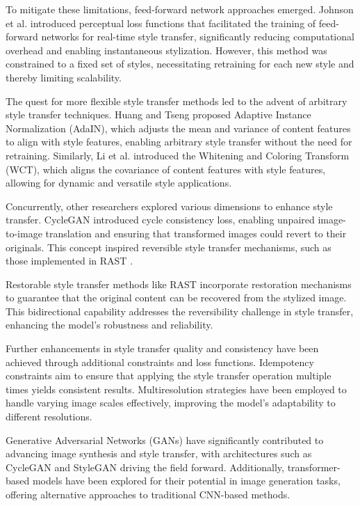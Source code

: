 \documentclass{article}
\begin{document}
To mitigate these limitations, feed-forward network approaches emerged. Johnson et al. \cite{Johnson2016} introduced perceptual loss functions that facilitated the training of feed-forward networks for real-time style transfer, significantly reducing computational overhead and enabling instantaneous stylization. However, this method was constrained to a fixed set of styles, necessitating retraining for each new style and thereby limiting scalability.

The quest for more flexible style transfer methods led to the advent of arbitrary style transfer techniques. Huang and Tseng \cite{Huang2017} proposed Adaptive Instance Normalization (AdaIN), which adjusts the mean and variance of content features to align with style features, enabling arbitrary style transfer without the need for retraining. Similarly, Li et al. \cite{Li2017} introduced the Whitening and Coloring Transform (WCT), which aligns the covariance of content features with style features, allowing for dynamic and versatile style applications.

Concurrently, other researchers explored various dimensions to enhance style transfer. CycleGAN \cite{CycleGAN2017} introduced cycle consistency loss, enabling unpaired image-to-image translation and ensuring that transformed images could revert to their originals. This concept inspired reversible style transfer mechanisms, such as those implemented in RAST \cite{Ma2023RAST}.

Restorable style transfer methods like RAST incorporate restoration mechanisms to guarantee that the original content can be recovered from the stylized image. This bidirectional capability addresses the reversibility challenge in style transfer, enhancing the model's robustness and reliability.

Further enhancements in style transfer quality and consistency have been achieved through additional constraints and loss functions. Idempotency constraints aim to ensure that applying the style transfer operation multiple times yields consistent results. Multiresolution strategies \cite{Li2018, Fernandez2019} have been employed to handle varying image scales effectively, improving the model's adaptability to different resolutions.

Generative Adversarial Networks (GANs) \cite{Goodfellow2014} have significantly contributed to advancing image synthesis and style transfer, with architectures such as CycleGAN \cite{CycleGAN2017} and StyleGAN \cite{StyleGAN2019} driving the field forward. Additionally, transformer-based models \cite{Dosovitskiy2020} have been explored for their potential in image generation tasks, offering alternative approaches to traditional CNN-based methods.
\end{document}
